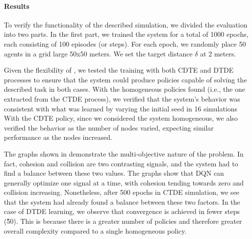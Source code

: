 \paragraph{Results}
To verify the functionality of the described simulation, 
 we divided the evaluation into two parts. 
%
In the first part, 
 we trained the system for a total of 1000 epochs, 
 each consisting of 100 episodes (or steps). 
%
For each epoch,
 we randomly place 50 agents in a grid large 50x50 meters.
 We set the target distance $\delta$ at 2 meters.

Given the flexibility of \scarlib{}, 
 we tested the training with both CDTE and DTDE processes 
 to ensure that the system could produce policies 
 capable of solving the described task in both cases. 
% 
With the homogeneous policies found (i.e., the one extracted from the CTDE process), 
 we verified that the system's behavior 
 was consistent with what was learned by varying the initial seed 
 in 16 simulations
%
With the CDTE policy, 
 since we considered the system homogeneous, 
 we also verified the behavior as the number of nodes varied,
 expecting similar performance as the nodes increased.

The graphs shown in  
 demonstrate the multi-objective nature of the problem. 
In fact, cohesion and collision are two contrasting signals, 
 and the system had to find a balance between these two values. 
 The graphs show that DQN can generally optimize one signal at a time, 
 with cohesion tending towards zero and collision increasing. 
% 
Nonetheless, after 500 epochs in CTDE simulation,  
 we see that the system had already found a balance between these two factors.
%
In the case of DTDE learning, 
 we observe that convergence is achieved in fewer steps (\~ 50). 
 This is because there is a greater number of policies and 
 therefore greater overall complexity compared to a single homogeneous policy.

